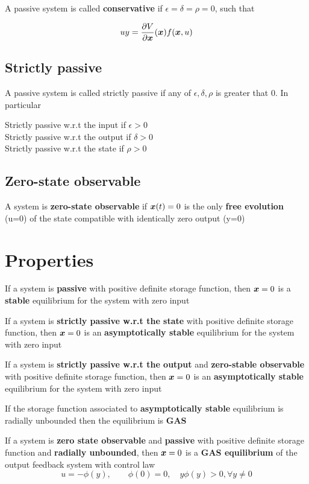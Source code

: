 A passive system is called \textbf{conservative} if $\epsilon = \delta = \rho = 0$, such that

\[
    uy = \frac{\partial V}{\partial \boldsymbol{x}}(\boldsymbol{x}) f(\boldsymbol{x},u)
\]

\subsection{Strictly passive}

A passive system is called strictly passive if any of $\epsilon, \delta, \rho$ is greater that $0$.
In particular

Strictly passive w.r.t the input if $\epsilon > 0$ \\
Strictly passive w.r.t the output if $\delta > 0$ \\
Strictly passive w.r.t the state if $\rho > 0$

\subsection{Zero-state observable}

A system is \textbf{zero-state observable} if $\boldsymbol{x}(t) = 0$ is the only \textbf{free evolution} (u=0) of the state compatible with identically zero output (y=0)

\section{Properties}

\begin{theorem}
    If a system is \textbf{passive} with positive definite storage function, then $\boldsymbol{x}=0$ is a \textbf{stable} equilibrium for the system with zero input
\end{theorem}

\begin{theorem}
    If a system is \textbf{strictly passive w.r.t the state} with positive definite storage function, then $\boldsymbol{x}=0$ is an \textbf{asymptotically stable} equilibrium for the system with zero input
\end{theorem}

\begin{theorem}
    If a system is \textbf{strictly passive w.r.t the output} and \textbf{zero-stable observable} with positive definite storage function, then $\boldsymbol{x}=0$ is an \textbf{asymptotically stable} equilibrium for the system with zero input
\end{theorem}

\begin{theorem}
    If the storage function associated to \textbf{asymptotically stable} equilibrium is radially unbounded then the equilibrium is \textbf{GAS}
\end{theorem}

\begin{theorem}
    If a system is \textbf{zero state observable} and \textbf{passive} with positive definite storage function and \textbf{radially unbounded}, then $\boldsymbol{x}=0$ is a \textbf{GAS equilibrium} of the output feedback system with control law
    \[
        u=-\phi(y),\qquad \phi(0)=0, \quad y\phi(y)>0, \forall y \neq 0
    \]
\end{theorem}